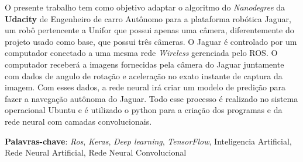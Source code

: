 
O presente trabalho tem como objetivo adaptar o algoritmo do \textit{Nanodegree} da \textbf{Udacity} de Engenheiro de carro Autônomo para a plataforma robótica Jaguar, um robô pertencente a Unifor que possui apenas uma câmera, diferentemente do projeto usado como base, que possui três câmeras.
O Jaguar é controlado por um computador conectado a uma mesma rede \textit{Wireless} gerenciada pelo ROS. O computador receberá a imagens fornecidas pela câmera do Jaguar juntamente com dados de angulo de rotação e aceleração no exato instante de captura da imagem. Com esses dados, a rede neural irá criar um modelo de predição para fazer a navegação autônoma do Jaguar. Todo esse processo é realizado no sistema operacional Ubuntu e é utilizado o python para a criação dos programas e da rede neural com camadas convolucionais.

\textbf{Palavras-chave}: \textit{Ros}, \textit{Keras}, \textit{Deep learning}, \textit{TensorFlow}, Inteligencia Artificial, Rede Neural Artificial, Rede Neural Convolucional

